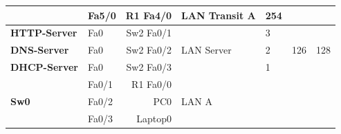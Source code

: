 \documentclass[11pt,a4paper]{report}
\begin{document}
\begin{longtable}[c]{llrllrr}
                                                               & Fa5/0                        & R1 Fa4/0                  & LAN Transit A                                         & 254                                              &                                                       &                                                           \\ \hline
            \textbf{HTTP-Server}                               & Fa0                          & Sw2 Fa0/1                 & \multirow{3}{*}{LAN Server}                           & 3                                                & \multirow{3}{*}{126}                                  & \multirow{3}{*}{128}                                      \\
            \textbf{DNS-Server}                                & Fa0                          & Sw2 Fa0/2                 &                                                       & 2                                                &                                                       &                                                           \\
            \textbf{DHCP-Server}                               & Fa0                          & Sw2 Fa0/3                 &                                                       & 1                                                &                                                       &                                                           \\ \hline
            \multirow{3}{*}{\textbf{Sw0}}                      & Fa0/1                        & R1 Fa0/0                  & \multirow{3}{*}{LAN A}                                & \multicolumn{3}{c}{\multirow{3}{*}{}}                                                                                                                                \\
                                                               & Fa0/2                        & PC0                       &                                                       & \multicolumn{3}{c}{}                                                                                                                                                 \\
                                                               & Fa0/3                        & Laptop0                   &                                                       & \multicolumn{3}{c}{}                                                                                                                                                 \\ \hline

\end{longtable}
\end{document}
